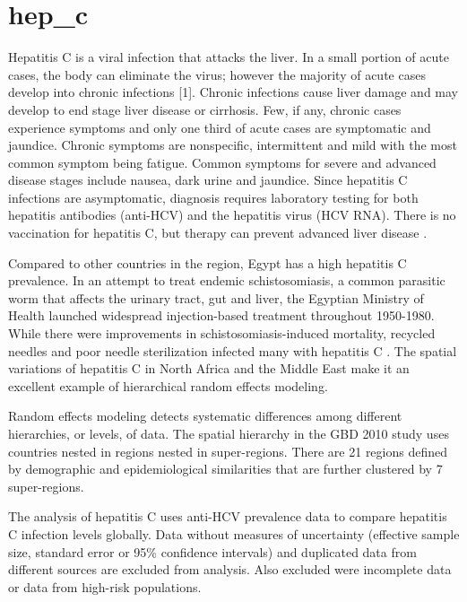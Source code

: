\chapter{hep_c}
\label{applications-rfx}

Hepatitis C is a viral infection that attacks the liver.  In a small portion of acute cases, the body can eliminate the virus; however the majority of acute cases develop into chronic infections [1].  Chronic infections cause liver damage and may develop to end stage liver disease or cirrhosis.  Few, if any, chronic cases experience symptoms and only one third of acute cases are symptomatic and jaundice.  Chronic symptoms are nonspecific, intermittent and mild with the most common symptom being fatigue.  Common symptoms for severe and advanced disease stages include nausea, dark urine and jaundice.  Since hepatitis C infections are asymptomatic, diagnosis requires laboratory testing for both hepatitis antibodies (anti-HCV) and the hepatitis virus (HCV RNA).  There is no vaccination for hepatitis C, but therapy can prevent advanced liver disease \cite{hoofnagle_hepatitis_1997, ghany_diagnosis_2009, hanafiah_global_2012}.

Compared to other countries in the region, Egypt has a high hepatitis C prevalence.  In an attempt to treat endemic schistosomiasis, a common parasitic worm that affects the urinary tract, gut and liver, the Egyptian Ministry of Health launched widespread injection-based treatment throughout 1950-1980.  While there were improvements in schistosomiasis-induced mortality, recycled needles and poor needle sterilization infected many with hepatitis C \cite{frank_role_2000, mezban_hepatitis_2006, strickland_liver_2006}.  The spatial variations of hepatitis C in North Africa and the Middle East make it an excellent example of hierarchical random effects modeling.

Random effects modeling detects systematic differences among different hierarchies, or levels, of data.  The spatial hierarchy in the GBD 2010 study uses countries nested in regions nested in super-regions.  There are 21 regions defined by demographic and epidemiological similarities that are further clustered by 7 super-regions.

The analysis of hepatitis C uses anti-HCV prevalence data to compare hepatitis C infection levels globally.  Data without measures of uncertainty (effective sample size, standard error or 95\% confidence intervals) and duplicated data from different sources are excluded from analysis.  Also excluded were incomplete data or data from high-risk populations.

